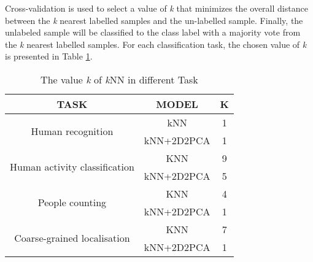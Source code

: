 Cross-validation is used to select a value of  \textit{k} that minimizes the overall distance between the  \textit{k} nearest labelled samples and the un-labelled sample. Finally, the unlabeled sample will be classified to the class label with a majority vote from the  \textit{k} nearest labelled samples. For each classification task, the chosen value of  \textit{k} is presented in Table \ref{tb-knn}.
\begin{table}[]
\centering
\caption{The value \textit{k} of \textit{k}NN in different Task}
\label{tb-knn}
\begin{tabular}{|c|c|c|}
\hline
\textbf{TASK}                                  & \textbf{MODEL} & \textbf{K} \\ \hline
\multirow{2}{*}{Human recognition}             & kNN            & 1          \\ \cline{2-3} 
                                               & kNN+2D2PCA     & 1          \\ \hline
\multirow{2}{*}{Human activity classification} & KNN            & 9          \\ \cline{2-3} 
                                               & kNN+2D2PCA     & 5          \\ \hline
\multirow{2}{*}{People counting}               & KNN            & 4          \\ \cline{2-3} 
                                               & kNN+2D2PCA     & 1          \\ \hline
\multirow{2}{*}{Coarse-grained localisation}   & KNN            & 7          \\ \cline{2-3} 
                                               & kNN+2D2PCA     & 1          \\ \hline
\end{tabular}
\end{table}